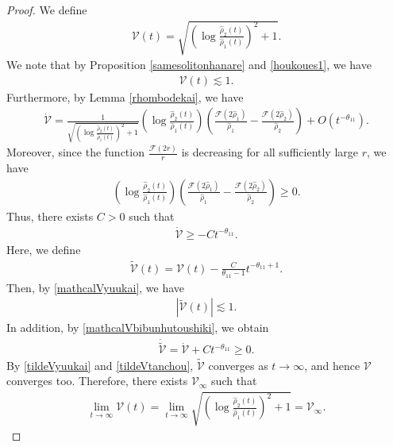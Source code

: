 \documentclass[reqno]{amsart}
\theoremstyle{plain}
\theoremstyle{definition}
\numberwithin{equation}{section}
\begin{document}
\begin{proof}
We define
\begin{align}\label{mathcalVdef}
\mathcal{V}(t)=\sqrt{ \left(\log{\frac{\hat{\rho}_2(t)}{\hat{\rho}_1(t)}}\right)^2+1}.
\end{align}
We note that by Proposition \ref{samesolitonhanare} and \eqref{houkoues1}, we have
\begin{align}\label{mathcalVyuukai}
\mathcal{V}(t)\lesssim 1.
\end{align}
Furthermore, by Lemma \ref{rhombodekai}, we have
\begin{align*}
\dot{\mathcal{V}}=\frac{1}{\sqrt{ \left(\log{\frac{\hat{\rho}_2(t)}{\hat{\rho}_1(t)}}\right)^2+1}}\left(\log{\frac{\hat{\rho}_2(t)}{\hat{\rho}_1(t)}} \right)\left(\frac{\mathcal{F}(2\hat{\rho}_1)}{\hat{\rho}_1}-\frac{\mathcal{F}(2\hat{\rho}_2)}{\hat{\rho}_2}\right)+O\left(t^{-\theta_{11}}\right).
\end{align*}
Moreover, since the function $\frac{\mathcal{F}(2r)}{r}$ is decreasing for all sufficiently large $r$, we have
\begin{align*}
\left(\log{\frac{\hat{\rho}_2(t)}{\hat{\rho}_1(t)}} \right)\left(\frac{\mathcal{F}(2\hat{\rho}_1)}{\hat{\rho}_1}-\frac{\mathcal{F}(2\hat{\rho}_2)}{\hat{\rho}_2}\right)\geq 0.
\end{align*}
Thus, there exists $C>0$ such that
\begin{align}\label{mathcalVbibunhutoushiki}
\dot{\mathcal{V}}\geq -Ct^{-\theta_{11}}.
\end{align}
Here, we define 
\begin{align*}
\tilde{\mathcal{V}}(t)=\mathcal{V}(t)-\frac{C}{\theta_{11}-1}t^{-\theta_{11}+1}.
\end{align*}
Then, by \eqref{mathcalVyuukai}, we have
\begin{align}\label{tildeVyuukai}
\left|\tilde{\mathcal{V}}(t)\right|\lesssim 1.
\end{align}
In addition, by \eqref{mathcalVbibunhutoushiki}, we obtain
\begin{align}\label{tildeVtanchou}
\dot{\tilde{\mathcal{V}}}=\dot{\mathcal{V}}+Ct^{-\theta_{11}}\geq 0. 
\end{align}
By \eqref{tildeVyuukai} and \eqref{tildeVtanchou}, $\tilde{\mathcal{V}}$ converges as $t\to\infty$, and hence $\mathcal{V}$ converges too. Therefore, there exists $\mathcal{V}_{\infty}$ such that
\begin{align*}
\lim_{t\to\infty}\mathcal{V}(t)=\lim_{t\to\infty}\sqrt{ \left(\log{\frac{\hat{\rho}_2(t)}{\hat{\rho}_1(t)}}\right)^2+1}=\mathcal{V}_{\infty}.

\end{align*}
\end{proof}
\end{document}
